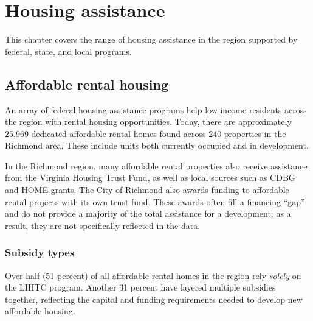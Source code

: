 \documentclass[
  letterpaper,
  DIV=11,
  numbers=noendperiod]{scrreprt}
\begin{document}
\hypertarget{part-2-3}{%
\chapter{Housing assistance}\label{part-2-3}}

This chapter covers the range of housing assistance in the region
supported by federal, state, and local programs.

\hypertarget{affordable-rental-housing}{%
\section{Affordable rental housing}\label{affordable-rental-housing}}

An array of federal housing assistance programs help low-income
residents across the region with rental housing opportunities. Today,
there are approximately 25,969 dedicated affordable rental homes found
across 240 properties in the Richmond area. These include units both
currently occupied and in development.

\begin{tcolorbox}[enhanced jigsaw, colframe=quarto-callout-tip-color-frame, arc=.35mm, bottomrule=.15mm, colbacktitle=quarto-callout-tip-color!10!white, opacityback=0, left=2mm, rightrule=.15mm, title=\textcolor{quarto-callout-tip-color}{\faLightbulb}\hspace{0.5em}{Funding sources}, colback=white, coltitle=black, toptitle=1mm, leftrule=.75mm, titlerule=0mm, breakable, opacitybacktitle=0.6, toprule=.15mm, bottomtitle=1mm]

In the Richmond region, many affordable rental properties also receive
assistance from the Virginia Housing Trust Fund, as well as local
sources such as CDBG and HOME grants. The City of Richmond also awards
funding to affordable rental projects with its own trust fund. These
awards often fill a financing ``gap'' and do not provide a majority of
the total assistance for a development; as a result, they are not
specifically reflected in the data.

\end{tcolorbox}

\hypertarget{subsidy-types}{%
\subsection{Subsidy types}\label{subsidy-types}}

Over half (51 percent) of all affordable rental homes in the region rely
\emph{solely} on the LIHTC program. Another 31 percent have layered
multiple subsidies together, reflecting the capital and funding
requirements needed to develop new affordable housing.
\end{document}
